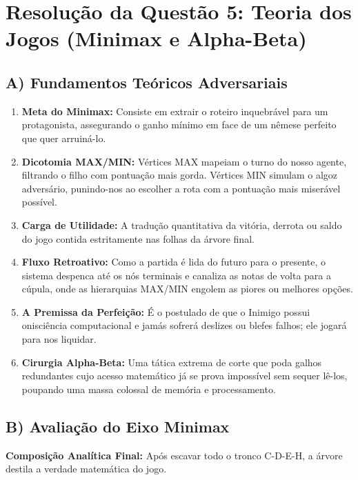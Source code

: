 \section*{Resolução da Questão 5: Teoria dos Jogos (Minimax e Alpha-Beta)}

\subsection*{A) Fundamentos Teóricos Adversariais}

\begin{enumerate}[label=\roman*)]
    \item \textbf{Meta do Minimax:} Consiste em extrair o roteiro inquebrável para um protagonista, assegurando o ganho mínimo em face de um nêmese perfeito que quer arruiná-lo.
    \item \textbf{Dicotomia MAX/MIN:} Vértices MAX mapeiam o turno do nosso agente, filtrando o filho com pontuação mais gorda. Vértices MIN simulam o algoz adversário, punindo-nos ao escolher a rota com a pontuação mais miserável possível.
    \item \textbf{Carga de Utilidade:} A tradução quantitativa da vitória, derrota ou saldo do jogo contida estritamente nas folhas da árvore final.
    \item \textbf{Fluxo Retroativo:} Como a partida é lida do futuro para o presente, o sistema despenca até os nós terminais e canaliza as notas de volta para a cúpula, onde as hierarquias MAX/MIN engolem as piores ou melhores opções.
    \item \textbf{A Premissa da Perfeição:} É o postulado de que o Inimigo possui onisciência computacional e jamás sofrerá deslizes ou blefes falhos; ele jogará para nos liquidar.
    \item \textbf{Cirurgia Alpha-Beta:} Uma tática extrema de corte que poda galhos redundantes cujo acesso matemático já se prova impossível sem sequer lê-los, poupando uma massa colossal de memória e processamento.
\end{enumerate}

\subsection*{B) Avaliação do Eixo Minimax}

\textbf{Composição Analítica Final:} Após escavar todo o tronco C-D-E-H, a árvore destila a verdade matemática do jogo.

